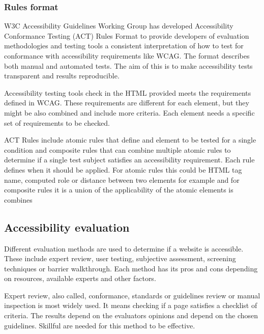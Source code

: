 \documentclass{master_thesis}
\begin{document}
\subsubsection{Rules format}

W3C Accessibility Guidelines Working Group has developed Accessibility Conformance Testing (ACT) Rules Format to provide developers of evaluation methodologies and testing tools a consistent interpretation of how to test for conformance with accessibility requirements like WCAG. The format describes both manual and automated tests. The aim of this is to make accessibility tests transparent and results reproducible. \citep{Fiers2019}

Accessibility testing tools check in the HTML provided meets the requirements defined in WCAG. These requirements are different for each element, but they might be also combined and include more criteria. Each element needs a specific set of requirements to be checked.

ACT Rules include atomic rules that define and element to be tested for a single condition and composite rules that can combine multiple atomic rules to determine if a single test subject satisfies an accessibility requirement. Each rule defines when it should be applied. For atomic rules this could be HTML tag name, computed role or distance between two elements for example and for composite rules it is a union of the applicability of the atomic elements is combines  \citep{Fiers2019}

\subsection{Accessibility evaluation}


Different evaluation methods are used to determine if a website is accessible. These include expert review, user testing, subjective assessment, screening techniques or barrier walkthrough. Each method has its pros and cons depending on resources, available experts and other factors.

Expert review, also called, conformance, standards or guidelines review or manual inspection is most widely used. It means checking if a page satisfies a checklist of criteria. The results depend on the evaluators opinions and depend on the chosen guidelines. Skillful are needed for this method to be effective. \citep{Brajnik2008}
\end{document}
